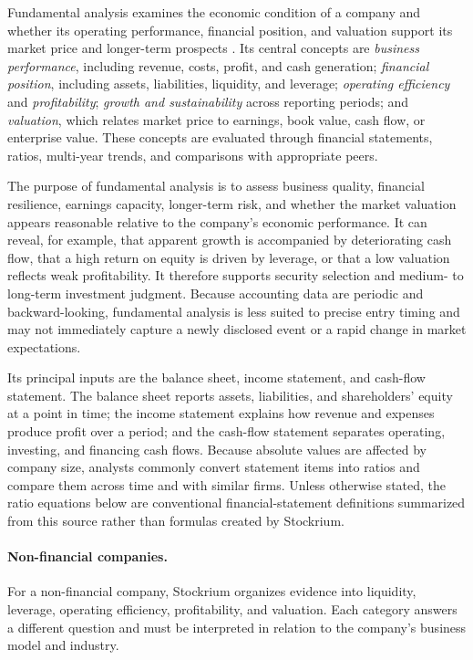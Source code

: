 Fundamental analysis examines the economic condition of a company and whether its operating performance, financial position, and valuation support its market price and longer-term prospects \cite{penman2013financial}. Its central concepts are \textit{business performance}, including revenue, costs, profit, and cash generation; \textit{financial position}, including assets, liabilities, liquidity, and leverage; \textit{operating efficiency} and \textit{profitability}; \textit{growth and sustainability} across reporting periods; and \textit{valuation}, which relates market price to earnings, book value, cash flow, or enterprise value. These concepts are evaluated through financial statements, ratios, multi-year trends, and comparisons with appropriate peers.

The purpose of fundamental analysis is to assess business quality, financial resilience, earnings capacity, longer-term risk, and whether the market valuation appears reasonable relative to the company's economic performance. It can reveal, for example, that apparent growth is accompanied by deteriorating cash flow, that a high return on equity is driven by leverage, or that a low valuation reflects weak profitability. It therefore supports security selection and medium- to long-term investment judgment. Because accounting data are periodic and backward-looking, fundamental analysis is less suited to precise entry timing and may not immediately capture a newly disclosed event or a rapid change in market expectations.

Its principal inputs are the balance sheet, income statement, and cash-flow statement. The balance sheet reports assets, liabilities, and shareholders' equity at a point in time; the income statement explains how revenue and expenses produce profit over a period; and the cash-flow statement separates operating, investing, and financing cash flows. Because absolute values are affected by company size, analysts commonly convert statement items into ratios and compare them across time and with similar firms. Unless otherwise stated, the ratio equations below are conventional financial-statement definitions summarized from this source rather than formulas created by Stockrium.

\paragraph{Non-financial companies.}

For a non-financial company, Stockrium organizes evidence into liquidity, leverage, operating efficiency, profitability, and valuation. Each category answers a different question and must be interpreted in relation to the company's business model and industry.

